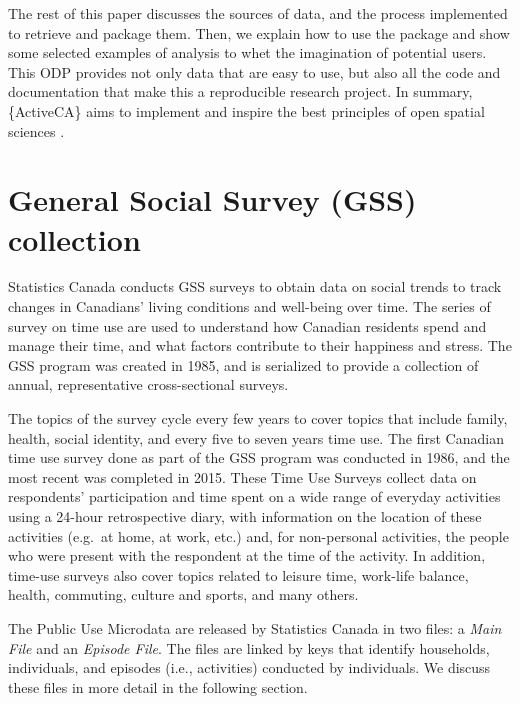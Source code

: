 \documentclass[Royal,times,sageh]{sagej}
\begin{document}
The rest of this paper discusses the sources of data, and the process
implemented to retrieve and package them. Then, we explain how to use
the package and show some selected examples of analysis to whet the
imagination of potential users. This ODP provides not only data that are
easy to use, but also all the code and documentation that make this a
reproducible research project. In summary, \{ActiveCA\} aims to
implement and inspire the best principles of open spatial sciences
\citep{paez_open_2021, brunsdon_opening_2021}.

\hypertarget{general-social-survey-gss-collection}{%
\section{General Social Survey (GSS)
collection}\label{general-social-survey-gss-collection}}

Statistics Canada \citeyearpar{statisticscanada2024} conducts GSS
surveys to obtain data on social trends to track changes in Canadians'
living conditions and well-being over time. The series of survey on time
use are used to understand how Canadian residents spend and manage their
time, and what factors contribute to their happiness and stress. The GSS
program was created in 1985, and is serialized to provide a collection
of annual, representative cross-sectional surveys.

The topics of the survey cycle every few years to cover topics that
include family, health, social identity, and every five to seven years
time use. The first Canadian time use survey done as part of the GSS
program was conducted in 1986, and the most recent was completed in
2015. These Time Use Surveys \citep{statisticscanada2022} collect data
on respondents' participation and time spent on a wide range of everyday
activities using a 24-hour retrospective diary, with information on the
location of these activities (e.g.~at home, at work, etc.) and, for
non-personal activities, the people who were present with the respondent
at the time of the activity. In addition, time-use surveys also cover
topics related to leisure time, work-life balance, health, commuting,
culture and sports, and many others.

The Public Use Microdata are released by Statistics Canada in two files:
a \emph{Main File} and an \emph{Episode File}. The files are linked by
keys that identify households, individuals, and episodes (i.e.,
activities) conducted by individuals. We discuss these files in more
detail in the following section.
\end{document}
